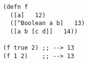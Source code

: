 \begin{lstlisting}[style=reclojureClojure,frame=single]
(defn f
  ([a]   12)
  ([^Boolean a b]   13)
  ([a b [c d]]   14))

(f true 2) ;; --> 13
(f 1 2)    ;; --> 13
\end{lstlisting}
